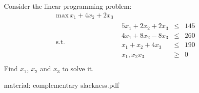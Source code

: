 \Exercise Consider the linear programming problem:
\begin{equation*}
  \begin{aligned}
    \text{max} \, x_1+4x_2+2x_3 \\
    \text{s.t.}\quad &
    \begin{array}{rcl}
      5x_1+2x_2+2x_3  & \leq & 145 \\
      4x_1+8x_2-8x_3  & \leq & 260 \\
      x_1+x_2+4x_3  & \leq & 190 \\
      x_1,x_2x_3  & \geq & 0 \\
    \end{array}
  \end{aligned}
\end{equation*}
Find $x_1$, $x_2$ and $x_3$ to solve it.

\Answer 

material: complementary slackness.pdf